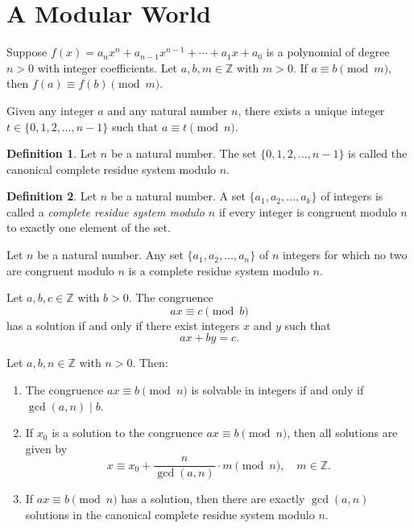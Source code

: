 \documentclass{article}
\theoremstyle{definition}
\newtheorem*{definition*}{Definition}
\newenvironment{manualtheorem}[1]{%
  \renewcommand{\thetheorem}{#1}%
  \theorem%
}{%
  \endtheorem%
}
\begin{document}
\section{A Modular World}

\begin{manualtheorem}{3.8}
	Suppose \(f(x) = a_n x^n + a_{n-1} x^{n-1} + \cdots + a_1 x + a_0\)
	is a polynomial of degree $n > 0$ with integer coefficients.
	Let $a, b, m \in \mathbb{Z}$ with $m > 0$.
	If \(a \equiv b \pmod{m},\)
	then \(f(a) \equiv f(b) \pmod{m}.\)
\end{manualtheorem}

\begin{manualtheorem}{3.14}
	Given any integer $a$ and any natural number $n$, there exists a unique integer \\ $t
		\in \{0,1,2,\ldots,n-1\}$ such that $a \equiv t \pmod{n}$.
\end{manualtheorem}

\begin{definition*}
	Let $n$ be a natural number. The set $\{0,1,2,\ldots,n-1\}$ is
	called the canonical complete residue system modulo $n$.
\end{definition*}

\begin{definition*}
Let $n$ be a natural number. A set $\{a_{1}, a_{2}, \ldots, a_{k}\}$ of integers is called a 
\emph{complete residue system modulo $n$} if every integer is congruent modulo $n$ to exactly
one element of the set.
\end{definition*}


\begin{manualtheorem}{3.17}
	Let $n$ be a natural number. Any set $\{a_1, a_2, \ldots, a_n\}$ of $n$ integers
	for which no two are congruent modulo $n$ is a complete residue system modulo $n$.
\end{manualtheorem}

\begin{manualtheorem}{3.19}
	Let $a, b, c \in \mathbb{Z}$ with $b > 0$. The congruence
	\[
		ax \equiv c \pmod{b}
	\]
	has a solution if and only if there exist integers $x$ and $y$ such that
	\[
		ax + by = c.
	\]
\end{manualtheorem}

\begin{manualtheorem}{3.24}
Let $a, b, n \in \mathbb{Z}$ with $n > 0$. Then:
\begin{enumerate}
    \item The congruence
    \(
        ax \equiv b \pmod{n}
    \)
    is solvable in integers if and only if $\gcd(a,n) \mid b$.
    
    \item If $x_0$ is a solution to the congruence $ax \equiv b \pmod{n}$, then all solutions are given by
    \[
        x \equiv x_0 + \frac{n}{\gcd(a,n)} \cdot m \pmod{n}, \quad m \in \mathbb{Z}.
    \]
    
    \item If $ax \equiv b \pmod{n}$ has a solution, then there are exactly $\gcd(a,n)$ solutions in the canonical complete residue system modulo $n$.
\end{enumerate}
\end{manualtheorem}
\end{document}
